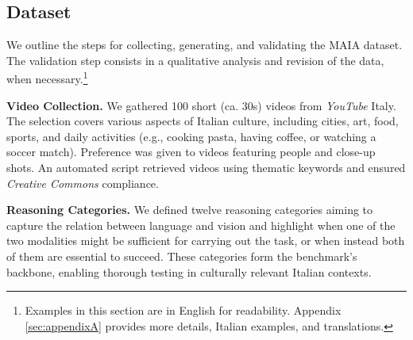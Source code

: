 \subsection{Dataset}
\label{subsec: Dataset}

We outline the steps for collecting, generating, and validating the MAIA dataset. The validation step consists in a qualitative analysis and revision of the data, when necessary.\footnote{Examples in this section are in English for readability. Appendix \ref{sec:appendixA} provides more details, Italian examples, and translations.} 

\textbf{Video Collection.} We gathered 100 short (ca. $30$s) videos from \textit{YouTube} Italy. The selection covers various aspects of Italian culture, including cities, art, food, sports, and daily activities (e.g., cooking pasta, having coffee, or watching a soccer match). Preference was given to videos featuring people and close-up shots. An automated script retrieved videos using thematic keywords and ensured \textit{Creative Commons} compliance.



\textbf{Reasoning Categories.} We defined twelve reasoning categories aiming to capture the relation between language and vision and highlight when one of the two modalities  might be sufficient for carrying out the task, or when instead both of them are essential to succeed. 
These categories form the benchmark’s backbone, enabling thorough testing in culturally relevant Italian contexts.

